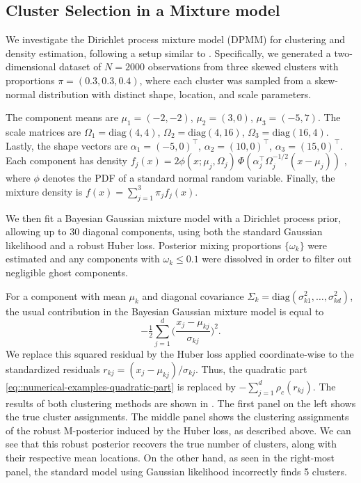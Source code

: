 \documentclass[11pt, oneside]{amsart}
\theoremstyle{definition}   %
\begin{document}
\subsection{Cluster Selection in a Mixture model}
%
We investigate the Dirichlet process mixture model (DPMM) \citep{murphy::mlbook} for clustering and density estimation, following a setup similar to \cite[Section 3.5]{wang:kucukelbir:blei2017}.
%
Specifically, we generated a two-dimensional dataset of \(N=2000\) observations from three skewed clusters with proportions \(\pi=(0.3,0.3,0.4)\), where each cluster was sampled from a skew-normal distribution with distinct shape, location, and scale parameters. 

The component means are \(\mu_1=(-2,-2)\), \(\mu_2=(3,0)\), \(\mu_3=(-5,7)\). 
%
The scale matrices are \(\Omega_1=\mathrm{diag}(4, 4)\), \(\Omega_2=\mathrm{diag}(4,16)\), \(\Omega_3=\mathrm{diag}(16,4)\). 
%
Lastly, the shape vectors are \(\alpha_1=(-5,0)^\top\), \(\alpha_2=(10,0)^\top\), \(\alpha_3=(15,0)^\top\). Each component has density \(f_j(x)=2 \phi(x;\mu_j,\Omega_j)\,\Phi (\alpha_j^\top \Omega_j^{-1/2}(x-\mu_j))\) \citep{skew-normal}, where \( \phi \) denotes the PDF of a standard normal random variable. Finally, the mixture density is \(f(x)=\sum_{j=1}^3 \pi_j f_j(x)\).


%
We then fit a Bayesian Gaussian mixture model with a Dirichlet process prior, allowing up to 30 diagonal components, using both the standard Gaussian likelihood and a robust Huber loss.
%
Posterior mixing proportions \(\{\omega_k\}\) were estimated and any components with \(\omega_k \leq  0.1\) were dissolved in order to filter out negligible ghost components. 

For a component with mean $\mu_k$ and diagonal covariance $\Sigma_k = \mathrm{diag}(\sigma_{k1}^2,\dots,\sigma_{kd}^2)$, the usual contribution in the Bayesian Gaussian mixture model is equal to
%
\begin{equation}    
\label{eq::numerical-examples-quadratic-part}
    -\tfrac{1}{2} \sum_{j=1}^d \Big( \frac{x_j - \mu_{kj}}{\sigma_{kj}} \Big)^2.
\end{equation}
%
We replace this squared residual by the Huber loss applied coordinate-wise to the standardized residuals 
%
$r_{kj} = (x_j - \mu_{kj})/\sigma_{kj}$. 
%
Thus, the quadratic part \eqref{eq::numerical-examples-quadratic-part} is replaced by 
\(
    - \sum_{j=1}^d \rho_c(r_{kj}).
\)
%
The results of both clustering methods are shown in .
%
The first panel on the left shows the true cluster assignments.
%
The middle panel shows the clustering assignments of the robust M-posterior induced by the Huber loss, as described above. 
%
We can see that this robust posterior recovers the true number of clusters, along with their respective mean locations. 
%
On the other hand, as seen in the right-most panel, the standard model using Gaussian likelihood incorrectly finds 5 clusters.
\end{document}
